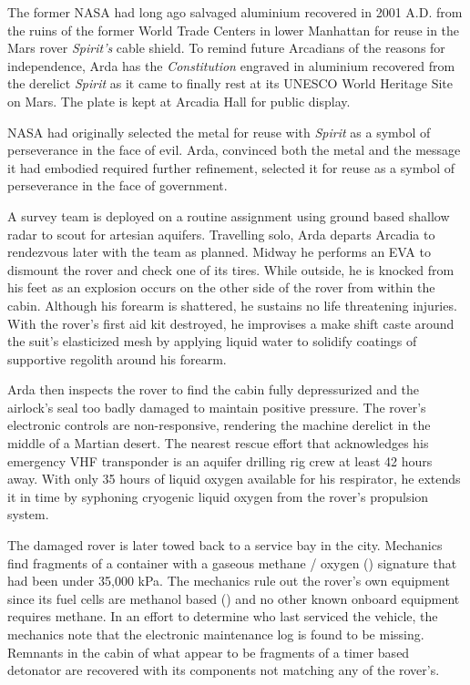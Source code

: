The former NASA had long ago salvaged aluminium recovered in 2001 A.D. from the ruins of the former World Trade Centers in lower Manhattan for reuse in the Mars rover {\it Spirit's} cable shield. To remind future Arcadians of the reasons for independence, Arda has the {\it Constitution} engraved in aluminium recovered from the derelict {\it Spirit} as it came to finally rest at its UNESCO World Heritage Site on Mars. The plate is kept at Arcadia Hall for public display.

NASA had originally selected the metal for reuse with {\it Spirit} as a symbol of perseverance in the face of evil. Arda, convinced both the metal and the message it had embodied required further refinement, selected it for reuse as a symbol of perseverance in the face of government.
\StopTimelineDate

A survey team is deployed on a routine assignment using ground based shallow radar to scout for artesian aquifers. Travelling solo, Arda departs Arcadia to rendezvous later with the team as planned. Midway he performs an EVA to dismount the rover and check one of its tires. While outside, he is knocked from his feet as an explosion occurs on the other side of the rover from within the cabin. Although his forearm is shattered, he sustains no life threatening injuries. With the rover's first aid kit destroyed, he improvises a make shift caste around the suit's elasticized mesh by applying liquid water to solidify coatings of supportive regolith around his forearm.

Arda then inspects the rover to find the cabin fully depressurized and the airlock's seal too badly damaged to maintain positive pressure. The rover's electronic controls are non-responsive, rendering the machine derelict in the middle of a Martian desert. The nearest rescue effort that acknowledges his emergency VHF transponder is an aquifer drilling rig crew at least 42 hours away. With only 35 hours of liquid oxygen available for his respirator, he extends it in time by syphoning cryogenic liquid oxygen from the rover's propulsion system.

The damaged rover is later towed back to a service bay in the city. Mechanics find fragments of a container with a gaseous methane / oxygen () signature that had been under 35,000 kPa. The mechanics rule out the rover's own equipment since its fuel cells are methanol based () and no other known onboard equipment requires methane. In an effort to determine who last serviced the vehicle, the mechanics note that the electronic maintenance log is found to be missing. Remnants in the cabin of what appear to be fragments of a timer based detonator are recovered with its components not matching any of the rover's.
\StopTimelineDate

